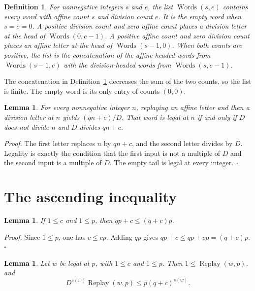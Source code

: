 \documentclass[11pt,letterpaper]{article}
\newtheorem{lemma}[theorem]{Lemma}
\newtheorem{definition}[theorem]{Definition}
\newenvironment{proof}{\noindent\textit{Proof.}}{\hfill\(\square\)}
\begin{document}
\begin{definition}
\label{def:words}
For nonnegative integers \(s\) and \(e\), the list \(\operatorname{Words}(s,e)\) contains every word with affine count \(s\) and division count \(e\). It is the empty word when \(s=e=0\). A positive division count and zero affine count places a division letter at the head of \(\operatorname{Words}(0,e-1)\). A positive affine count and zero division count places an affine letter at the head of \(\operatorname{Words}(s-1,0)\). When both counts are positive, the list is the concatenation of the affine-headed words from \(\operatorname{Words}(s-1,e)\) with the division-headed words from \(\operatorname{Words}(s,e-1)\).
\end{definition}

The concatenation in Definition~\ref{def:words} decreases the sum of the two counts, so the list is finite. The empty word is its only entry of counts \((0,0)\).

\begin{lemma}
\label{lem:edge}
For every nonnegative integer \(n\), replaying an affine letter and then a division letter at \(n\) yields \((qn+c)/D\). That word is legal at \(n\) if and only if \(D\) does not divide \(n\) and \(D\) divides \(qn+c\).
\end{lemma}

\begin{proof}
The first letter replaces \(n\) by \(qn+c\), and the second letter divides by \(D\). Legality is exactly the condition that the first input is not a multiple of \(D\) and the second input is a multiple of \(D\). The empty tail is legal at every integer.
\end{proof}

\section{The ascending inequality}

\begin{lemma}
\label{lem:affine-bound}
If \(1\le c\) and \(1\le p\), then \(qp+c\le(q+c)p\).
\end{lemma}

\begin{proof}
Since \(1\le p\), one has \(c\le cp\). Adding \(qp\) gives \(qp+c\le qp+cp=(q+c)p\).
\end{proof}

\begin{lemma}
\label{lem:height}
Let \(w\) be legal at \(p\), with \(1\le c\) and \(1\le p\). Then \(1\le\operatorname{Replay}(w,p)\), and
\[
D^{e(w)}\operatorname{Replay}(w,p)\le p(q+c)^{s(w)}.
\]
\end{lemma}
\end{document}
